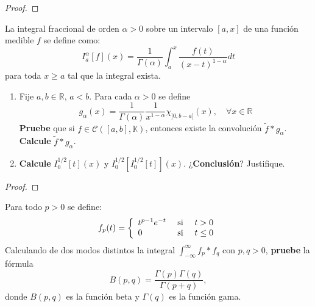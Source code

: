 \documentclass[12pt]{report}
\theoremstyle{largebreak}
\begin{document}
    \begin{proof}
        
    \end{proof}

    \begin{excer}
        La integral fraccional de orden $\alpha>0$ sobre un intervalo $[a,x]$ de una función medible $f$ se define como:
        \begin{equation*}
            I_a^\alpha[f](x)=\frac{1}{\Gamma(\alpha)}\int_a^x\frac{f(t)}{(x-t)^{1-\alpha}}dt
        \end{equation*}
        para toda $x\geq a$ tal que la integral exista.
        \begin{enumerate}
            \item Fije $a,b\in\mathbb{R}$, $a<b$. Para cada $\alpha>0$ se define
            \begin{equation*}
                g_\alpha(x)=\frac{1}{\Gamma(\alpha)}\frac{1}{x^{1-\alpha}}\chi_{]0,b-a[}(x),\quad\forall x\in\mathbb{R}
            \end{equation*}
            \textbf{Pruebe} que si $f\in\mathcal{C}([a,b],\mathbb{K})$, entonces existe la convolución $\widetilde{f}*g_\alpha$. \textbf{Calcule} $\widetilde{f}*g_\alpha$.

            \item \textbf{Calcule} $I_0^{1/2}[t](x)$ y $I_0^{1/2}[I_0^{1/2}[t]](x)$. ¿\textbf{Conclusión}? Justifique.
        \end{enumerate}
    \end{excer}

    \begin{proof}
        
    \end{proof}

    \begin{excer}
        Para todo $p>0$ se define:
        \begin{equation*}
            f_p(t)=\left\{\begin{array}{lcr}
                t^{p-1}e^{-t} & \textup{ si }& t>0\\
                0 & \textup{ si } & t\leq 0\\
            \end{array}
            \right.
        \end{equation*}
        Calculando de dos modos distintos la integral $\int_{-\infty}^\infty f_p*f_q$ con $p,q>0$, \textbf{pruebe} la fórmula
        \begin{equation*}
            B(p,q)=\frac{\Gamma(p)\Gamma(q)}{\Gamma(p+q)},
        \end{equation*}
        donde $B(p,q)$ es la función beta y $\Gamma(q)$ es la función gama.
    \end{excer}
    
\end{document}
